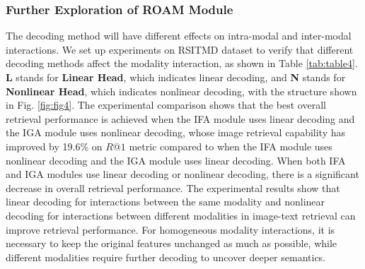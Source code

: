 \documentclass[journal]{IEEEtran}
\begin{document}
\begin{table}[t]
\renewcommand\arraystretch{1.5}
\caption{Comparison experiments with different IFA/IGA Heads on RSITMD test set.}
\label{tab:table4}
\end{table}
\subsubsection{Further Exploration of ROAM Module}
The decoding method will have different effects on intra-modal and inter-modal interactions. We set up experiments on RSITMD dataset to verify that different decoding methods affect the modality interaction, as shown in Table \ref{tab:table4}. \textbf{L} stands for \textbf{Linear Head}, which indicates linear decoding, and \textbf{N} stands for \textbf{Nonlinear Head}, which indicates nonlinear decoding, with the structure shown in Fig. \ref{fig:fig4}. The experimental comparison shows that the best overall retrieval performance is achieved when the IFA module uses linear decoding and the IGA module uses nonlinear decoding, whose image retrieval capability has improved by 19.6\% on $R@1$ metric compared to when the IFA module uses nonlinear decoding and the IGA module uses linear decoding. When both IFA and IGA modules use linear decoding or nonlinear decoding, there is a significant decrease in overall retrieval performance. The experimental results show that linear decoding for interactions between the same modality and nonlinear decoding for interactions between different modalities in image-text retrieval can improve retrieval performance. For homogeneous modality interactions, it is necessary to keep the original features unchanged as much as possible, while different modalities require further decoding to uncover deeper semantics.
\end{document}
